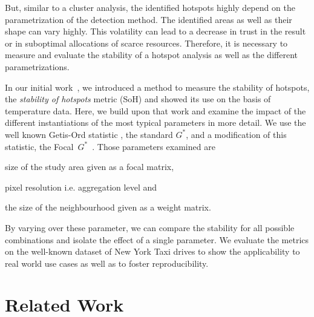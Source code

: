 \documentclass{itatnew}
\begin{document}
But, similar to a cluster analysis, the identified hotspots highly depend on 
the parametrization of the detection method. The identified areas as well as 
their shape can vary highly. This volatility can lead to a decrease in trust in 
the result or in suboptimal allocations of scarce resources. Therefore, it is 
necessary to measure and evaluate the stability of a hotspot analysis as well 
as the different parametrizations. 

In our initial work~\cite{SoH-GI-Forum}, we introduced a method to measure the 
stability of hotspots, the \emph{stability of hotspots} metric (SoH) and showed 
its use on the basis of temperature data.
Here, we build upon that work and examine the impact of the 
different instantiations of the most typical parameters in more detail. We use 
the well known 
Getis-Ord statistic \cite{Ord.1995}, the standard $G^*$, and a modification of 
this statistic, the Focal~$G^*$~\cite{SoH-GI-Forum}.
Those parameters examined are
\begin{inparaenum}[(1)]
   \item size of the study area given as a focal matrix,
   \item pixel resolution i.e. aggregation level and 
   \item the size of the neighbourhood given as a weight matrix.
\end{inparaenum}
By varying over these parameter, we can compare the stability for all possible 
combinations and isolate the effect of a single parameter.
We evaluate the metrics on the well-known dataset of New York Taxi drives to 
show the applicability to real world use cases as well as to foster 
reproducibility.

\section{Related Work}
\end{document}
